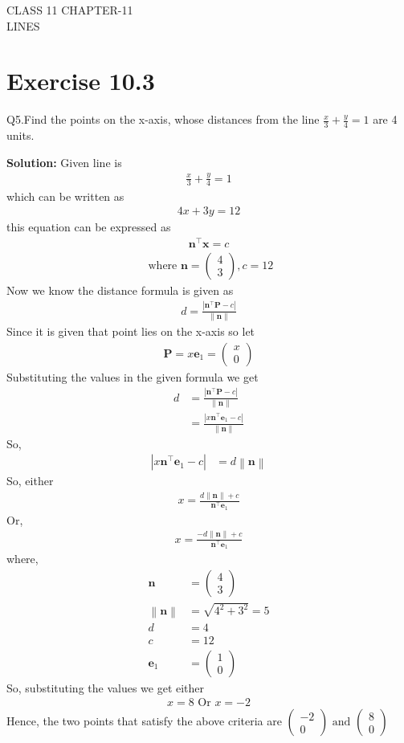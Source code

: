 \documentclass[12pt]{article}
\providecommand{\norm}[1]{\left\lVert#1\right\rVert}
\newcommand{\solution}{\noindent \textbf{Solution: }}
\newcommand{\myvec}[1]{\ensuremath{\begin{pmatrix}#1\end{pmatrix}}}
\providecommand{\abs}[1]{\left\vert#1\right\vert}
\let\vec\mathbf
\begin{document}
\begin{center}
\textbf\large{CLASS 11 CHAPTER-11 \\ LINES}

\end{center}
\section*{Exercise 10.3}

Q5.Find the points on the x-axis, whose distances from the line $\frac{x}{3}+\frac{y}{4}=1$ are 4 units.

\solution
Given line is 
\begin{align}
	\frac{x}{3}+\frac{y}{4}=1
\end{align}
which can be written as
\begin{align}
	4x+3y=12
\end{align}
this equation can be expressed as 
\begin{align}
	\vec{n}^{\top}\vec{x}=c
\end{align}
\begin{align}
	\text{ where }
		\vec{n} = \myvec{4\\3} , c = 12
\end{align}
Now we know the distance formula is given as
\begin{align}
	d = \frac{\abs{\vec{n}^\top\vec{P}-c}}{\norm{\vec{n}}}
\end{align}
Since it is given that point lies on the x-axis so let
\begin{align}
	\vec{P} = x\vec{e}_{1} = \myvec{x\\0}
\end{align}
Substituting the values in the given formula we get
\begin{align}
	d &= \frac{\abs{\vec{n}^\top\vec{P}-c}}{\norm{\vec{n}}}\\
	  &= \frac{\abs{x\vec{n}^\top\vec{e}_{1}-c}}{\norm{\vec{n}}}
\end{align}
So,
\begin{align}
	\abs{x\vec{n}^\top\vec{e}_{1}-c} &= d\norm{\vec{n}}
\end{align}
So, either
\begin{align}
	x = \frac{d\norm{\vec{n}}+c}{\vec{n}^\top\vec{e}_{1}}
\end{align}
Or,
\begin{align}
	x = \frac{-d\norm{\vec{n}}+c}{\vec{n}^\top\vec{e}_{1}}
\end{align}
where,
\begin{align}
	\vec{n} &= \myvec{4\\3}\\
	\norm{\vec{n}} &= \sqrt{4^2+3^2} = 5\\
	d &= 4\\
	c &= 12\\
	\vec{e}_{1} &= \myvec{1\\0}
\end{align}
So, substituting the values we get either
\begin{align}
	x = 8
	\text{ Or }
	x = -2
\end{align}
Hence, the two points that satisfy the above criteria are $\myvec{-2\\0} \text{ and } \myvec{8\\0}$	
\end{document}
